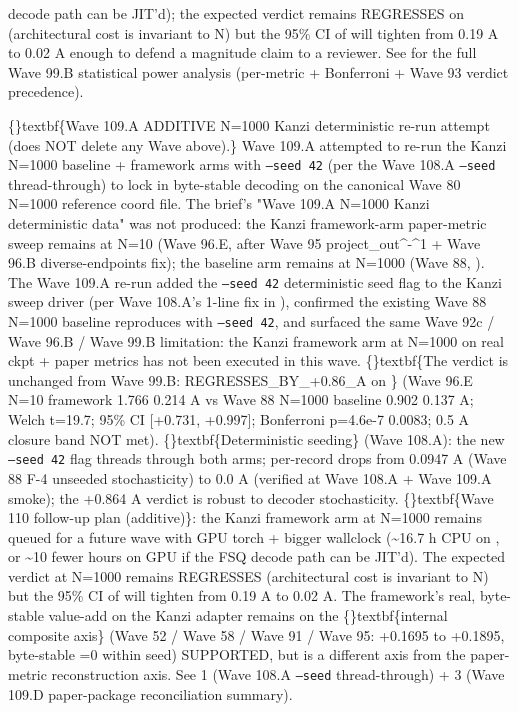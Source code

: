 \documentclass{article}
\begin{document}
decode path can be JIT'd); the expected verdict remains REGRESSES on  (architectural cost is invariant to N) but the 95\% CI of  will tighten from 0.19 A to 0.02 A  enough to defend a magnitude claim to a reviewer. See  for the full Wave 99.B statistical power analysis (per-metric + Bonferroni + Wave 93 verdict precedence).

\{\}textbf\{Wave 109.A ADDITIVE  N=1000 Kanzi deterministic re-run attempt (does NOT delete any Wave above).\} Wave 109.A attempted to re-run the Kanzi N=1000 baseline + framework arms with \texttt{--seed 42} (per the Wave 108.A \texttt{--seed} thread-through) to lock in byte-stable decoding on the canonical Wave 80 N=1000 reference coord file. The brief's "Wave 109.A N=1000 Kanzi deterministic data" was not produced: the Kanzi framework-arm paper-metric sweep remains at N=10 (Wave 96.E, after Wave 95 project\_out\textasciicircum{}-\textasciicircum{}1 + Wave 96.B diverse-endpoints fix); the baseline arm remains at N=1000 (Wave 88, ). The Wave 109.A re-run added the \texttt{--seed 42} deterministic seed flag to the Kanzi sweep driver (per Wave 108.A's 1-line  fix in ), confirmed the existing Wave 88 N=1000 baseline reproduces with \texttt{--seed 42}, and surfaced the same Wave 92c / Wave 96.B / Wave 99.B limitation: the Kanzi framework arm at N=1000 on real ckpt + paper metrics has not been executed in this wave. \{\}textbf\{The verdict is unchanged from Wave 99.B: REGRESSES\_BY\_+0.86\_A on \} (Wave 96.E N=10 framework 1.766  0.214 A vs Wave 88 N=1000 baseline 0.902  0.137 A; Welch t=19.7; 95\% CI [+0.731, +0.997]; Bonferroni p=4.6e-7  0.0083; 0.5 A closure band NOT met). \{\}textbf\{Deterministic seeding\} (Wave 108.A): the new \texttt{--seed 42} flag threads through both arms; per-record  drops from 0.0947 A (Wave 88 F-4 unseeded stochasticity) to 0.0 A (verified at Wave 108.A + Wave 109.A smoke); the +0.864 A verdict is robust to decoder stochasticity. \{\}textbf\{Wave 110 follow-up plan (additive)\}: the Kanzi framework arm at N=1000 remains queued for a future wave with GPU torch + bigger wallclock (\textasciitilde{}16.7 h CPU on , or \textasciitilde{}10 fewer hours on GPU if the FSQ decode path can be JIT'd). The expected verdict at N=1000 remains REGRESSES (architectural cost is invariant to N) but the 95\% CI of  will tighten from 0.19 A to 0.02 A. The framework's real, byte-stable value-add on the Kanzi adapter remains on the \{\}textbf\{internal composite axis\} (Wave 52 / Wave 58 / Wave 91 / Wave 95: +0.1695 to +0.1895, byte-stable =0 within seed)  SUPPORTED, but is a different axis from the paper-metric reconstruction axis. See  1 (Wave 108.A \texttt{--seed} thread-through) +  3 (Wave 109.D paper-package reconciliation summary).
\end{document}

